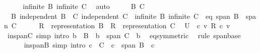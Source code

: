 \begin{isabellebody}
\ \ \isamarkupfalse%
\ \isamarkupfalse%
\ {\isachardoublequoteopen}infinite\ B{\isachardoublequoteclose}\ {\isachardoublequoteopen}infinite\ C{\isachardoublequoteclose}\ \isamarkupfalse%
\ auto\isanewline
\ \ \isacommand{{\isacharbraceleft}{\kern0pt}}\isamarkupfalse%
\ \isamarkupfalse%
\ B\ C\ \isamarkupfalse%
\ \ B{\isacharcolon}{\kern0pt}\ {\isachardoublequoteopen}independent\ B{\isachardoublequoteclose}\ \ C{\isacharcolon}{\kern0pt}\ {\isachardoublequoteopen}independent\ C{\isachardoublequoteclose}\ \ {\isachardoublequoteopen}infinite\ B{\isachardoublequoteclose}\ {\isachardoublequoteopen}infinite\ C{\isachardoublequoteclose}\ \ eq{\isacharcolon}{\kern0pt}\ {\isachardoublequoteopen}span\ B\ {\isacharequal}{\kern0pt}\ span\ C{\isachardoublequoteclose}\isanewline
\ \ \ \ \isamarkupfalse%
\ {\isacharquery}{\kern0pt}R\ {\isacharequal}{\kern0pt}\ {\isachardoublequoteopen}representation\ B{\isachardoublequoteclose}\ \ {\isacharquery}{\kern0pt}R{\isacharprime}{\kern0pt}\ {\isacharequal}{\kern0pt}\ {\isachardoublequoteopen}representation\ C{\isachardoublequoteclose}\ \isamarkupfalse%
\ {\isacharquery}{\kern0pt}U\ {\isacharequal}{\kern0pt}\ {\isachardoublequoteopen}{\isasymlambda}c{\isachardot}{\kern0pt}\ {\isacharbraceleft}{\kern0pt}v{\isachardot}{\kern0pt}\ {\isacharquery}{\kern0pt}R\ c\ v\ {\isasymnoteq}\ {}{\isacharbraceright}{\kern0pt}{\isachardoublequoteclose}\isanewline
\ \ \ \ \isamarkupfalse%
\ in{\isacharunderscore}{\kern0pt}span{\isacharunderscore}{\kern0pt}C\ {\isacharbrackleft}{\kern0pt}simp{\isacharcomma}{\kern0pt}\ intro{\isacharbrackright}{\kern0pt}{\isacharcolon}{\kern0pt}\ {\isacartoucheopen}b\ {\isasymin}\ B\ {\isasymLongrightarrow}\ b\ {\isasymin}\ span\ C{\isacartoucheclose}\ \ b\ \isamarkupfalse%
\ eq{\isacharbrackleft}{\kern0pt}symmetric{\isacharbrackright}{\kern0pt}\ \isamarkupfalse%
\ {\isacharparenleft}{\kern0pt}rule\ span{\isacharunderscore}{\kern0pt}base{\isacharparenright}{\kern0pt}\ \isanewline
\ \ \ \ \isamarkupfalse%
\ in{\isacharunderscore}{\kern0pt}span{\isacharunderscore}{\kern0pt}B\ {\isacharbrackleft}{\kern0pt}simp{\isacharcomma}{\kern0pt}\ intro{\isacharbrackright}{\kern0pt}{\isacharcolon}{\kern0pt}\ {\isacartoucheopen}c\ {\isasymin}\ C\ {\isasymLongrightarrow}\ c\ {\isasymin}\ span\ B{\isacartoucheclose}\ \ c\ \isamarkupfalse%

\end{isabellebody}
